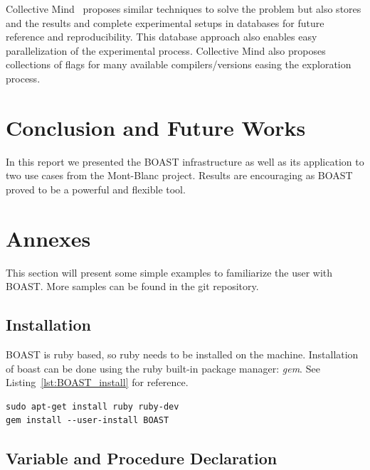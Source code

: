 \documentclass[11pt, a4paper, twoside]{montblanc}
\begin{document}
  Collective Mind~\cite{fursin:hal-01054763} proposes similar techniques to
solve the problem but also stores and the results and complete experimental
setups in databases for future reference and reproducibility. This database
approach also enables easy parallelization of the experimental process.
Collective Mind also proposes collections of flags for many available
compilers/versions easing the exploration process.

\section{Conclusion and Future Works}

In this report we presented the BOAST infrastructure as well as its
application to two use cases from the Mont-Blanc project. Results are
encouraging as BOAST proved to be a powerful and flexible tool.




\section*{Annexes}

This section will present some simple examples to familiarize the user with
BOAST. More samples can be found in the git repository.

\subsection*{Installation}

BOAST is ruby based, so ruby needs to be installed on the machine.
Installation of boast can be done using the ruby built-in package manager:
\textit{gem}. See Listing~\ref{lst:BOAST_install} for reference.

\begin{lstlisting}
sudo apt-get install ruby ruby-dev
gem install --user-install BOAST
\end{lstlisting}

\subsection*{Variable and Procedure Declaration}
\end{document}
